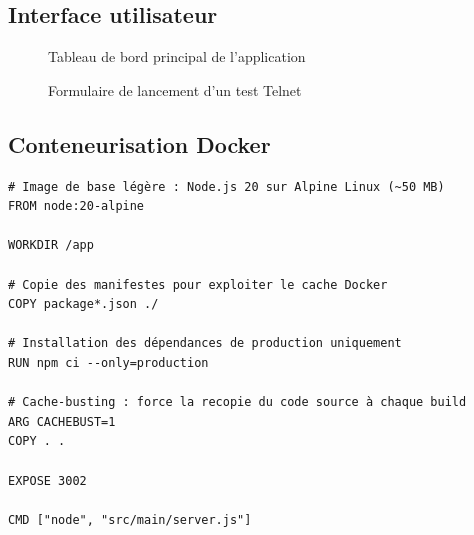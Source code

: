 \subsection{Interface utilisateur}

\begin{figure}[H]
  \centering
  \caption{Tableau de bord principal de l'application}
  \label{fig:dashboard}
\end{figure}

\begin{figure}[H]
  \centering
  \caption{Formulaire de lancement d'un test Telnet}
  \label{fig:form_test}
\end{figure}

\subsection{Conteneurisation Docker}

\begin{lstlisting}[language=docker,
  caption={backend/Dockerfile — image Node.js 20 Alpine},
  label={lst:dockerfile_back}]
# Image de base légère : Node.js 20 sur Alpine Linux (~50 MB)
FROM node:20-alpine

WORKDIR /app

# Copie des manifestes pour exploiter le cache Docker
COPY package*.json ./

# Installation des dépendances de production uniquement
RUN npm ci --only=production

# Cache-busting : force la recopie du code source à chaque build
ARG CACHEBUST=1
COPY . .

EXPOSE 3002

CMD ["node", "src/main/server.js"]
\end{lstlisting}

